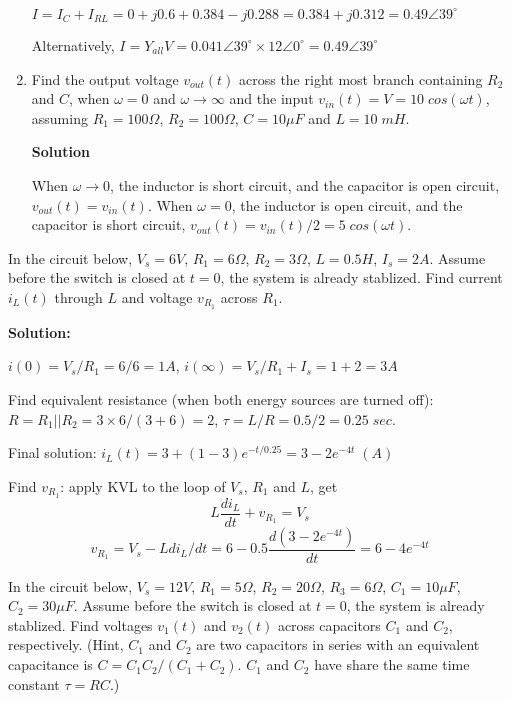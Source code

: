 \begin{enumerate}
$I=I_C+I_{RL}=0+j0.6+0.384-j0.288=0.384+j0.312=0.49\angle{39^\circ}$

Alternatively,
$I=Y_{all}V=0.041\angle{39^\circ} \times 12\angle{0^\circ}=0.49\angle{39^\circ}$


\item Find the output voltage $v_{out}(t)$ across the right most branch
containing $R_2$ and $C$, when $\omega=0$ and $\omega\rightarrow \infty$ 
and the input $v_{in}(t)=V=10\;cos(\omega t)$, assuming $R_1=100\Omega$, 
$R_2=100\Omega$, $C=10\mu F$ and $L=10\;mH$.


 {\bf Solution}
 
 When $\omega\rightarrow 0$, the inductor is short circuit, and the capacitor 
 is open circuit, $v_{out}(t)=v_{in}(t)$. When $\omega=0$, the inductor is open 
 circuit, and the capacitor is  short circuit, $v_{out}(t)=v_{in}(t)/2=5\;cos(\omega t)$.

\end{enumerate}



\item In the circuit below, $V_s=6V$, $R_1=6\Omega$, $R_2=3\Omega$,
$L=0.5H$, $I_s=2A$. Assume before the switch is closed at $t=0$, the
system is already stablized. Find current $i_L(t)$ through $L$ and 
voltage $v_{R_1}$ across $R_1$.


{\bf Solution:}

 $i(0)=V_s/R_1=6/6=1A$, $i(\infty)=V_s/R_1+I_s=1+2=3A$

 Find equivalent resistance (when both energy sources are turned off):
 $R=R_1 || R_2=3\times 6/(3+6)=2$, $\tau=L/R=0.5/2=0.25\;sec.$

 Final solution:
 $i_L(t)=3+(1-3)e^{-t/0.25}=3-2 e^{-4t} \; (A)$

 Find $v_{R_1}$: apply KVL to the loop of $V_s$, $R_1$ and $L$, get
 \[ L\frac{di_L}{dt}+v_{R_1}=V_s	\]
 \[ v_{R_1}=V_s-L di_L/dt=6-0.5 \frac{d(3-2 e^{-4t})}{dt}=6-4e^{-4t}	\]

\item In the circuit below, $V_s=12V$, $R_1=5\Omega$, $R_2=20\Omega$,
$R_3=6\Omega$, $C_1=10\mu F$, $C_2=30\mu F$. Assume before the switch 
is closed at $t=0$, the system is already stablized. Find voltages
$v_1(t)$ and $v_2(t)$ across capacitors $C_1$ and $C_2$, respectively.
(Hint, $C_1$ and $C_2$ are two capacitors in series with an equivalent
capacitance is $C=C_1 C_2/(C_1+C_2)$. $C_1$ and $C_2$ have share the same
time constant $\tau=RC$.)

